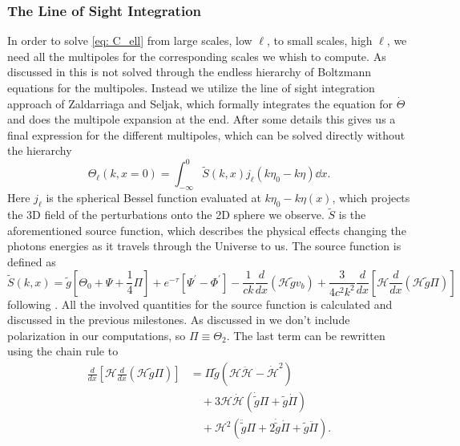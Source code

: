 \documentclass[10pt,a4paper]{article}
\providecommand{\gtilde}
{
  \ensuremath{
    \tilde{g}
  }
}
\providecommand{\hprime}
{
  \ensuremath{
    \mathcal{H}
  }
}
\begin{document}
\subsubsection{The Line of Sight Integration}
\label{subsubsec:Theory/LOS int}
In order to solve \cref{eq: C_ell} from large scales, low $\ell$, to small scales, high $\ell$, we need all the multipoles for the corresponding scales we whish to compute. As discussed in \cite{milestone3} this is not solved through the endless hierarchy of Boltzmann equations for the multipoles. Instead we utilize the line of sight integration approach of Zaldarriaga and Seljak, which formally integrates the equation for $\dot{\Theta}$ and does the multipole expansion at the end. After some details this gives us a final expression for the different multipoles, which can be solved directly without the hierarchy
\begin{equation}
  \Theta_\ell (k, x=0) = \int_{-\infty}^0 \tilde{S}(k,x)j_\ell\left(k\eta_0 - k\eta\right)\dd{x}.
  \label{eq: LOS integration}
\end{equation}
Here $j_\ell$ is the spherical Bessel function evaluated at $k\eta_0 - k\eta(x)$, which projects the 3D field of the perturbations onto the 2D sphere we observe. $\tilde{S}$ is the aforementioned source function, which describes the physical effects changing the photons energies as it travels through the Universe to us. The source function is defined as 
\begin{equation}
  \tilde{S}(k,x) = \tilde{g}\left[ \Theta_0 + \Psi + \frac{1}{4}\Pi\right] +
  e^{-\tau} \left[\Psi^\prime-\Phi^\prime\right] -
  \frac{1}{ck}\frac{d}{dx}(\mathcal{H}\tilde{g}v_b) + \frac{3}{4c^2k^2} \frac{d}{dx}
  \left[\mathcal{H}\frac{d}{dx} (\mathcal{H}\tilde{g}\Pi)\right]
  \label{eq: Full source}
\end{equation}
following \cite{Calin}. All the involved quantities for the source function is calculated and discussed in the previous milestones. As discussed in \cite{milestone3} we don't include polarization in our computations, so $\Pi \equiv \Theta_2$. The last term can be rewritten using the chain rule to
\begin{align*}
  \frac{d}{dx}
  \left[\mathcal{H}\frac{d}{dx} (\mathcal{H}\tilde{g}\Pi)\right] &= \Pi \gtilde \left(\hprime \ddot{\hprime} - \dot{\hprime}^2\right) \\
  &\quad + 3\hprime\dot{\hprime}\left(\dot{\gtilde}\Pi+\gtilde\dot{\Pi}\right)\\
  &\quad + \hprime^2\left(\ddot{\gtilde}\Pi + 2\dot{\gtilde}\dot{\Pi} + \gtilde\ddot{\Pi}\right).
\end{align*}
\end{document}
